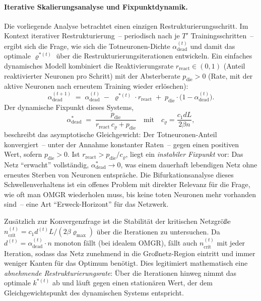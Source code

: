 \documentclass[12pt, a4paper, openany]{report}
\begin{document}
\paragraph{Iterative Skalierungsanalyse und Fixpunktdynamik.}
Die vorliegende Analyse betrachtet einen einzigen Restrukturierungsschritt.
Im Kontext iterativer Restrukturierung~-- periodisch nach je $T'$
Trainingsschritten~-- ergibt sich die Frage, wie sich die Totneuronen-Dichte
$\alpha_{\mathrm{dead}}^{(t)}$ und damit das optimale $\varrho^{*(t)}$ über
die Restrukturierungsiterationen entwickeln.  Ein einfaches dynamisches
Modell kombiniert die Reaktivierungsrate $r_{\mathrm{react}} \in (0,1)$
(Anteil reaktivierter Neuronen pro Schritt) mit der Absterberate
$p_{\mathrm{die}} > 0$ (Rate, mit der aktive Neuronen nach erneutem Training
wieder erlöschen):
\[
  \alpha_{\mathrm{dead}}^{(t+1)}
  \;=\;
  \alpha_{\mathrm{dead}}^{(t)}
  \;-\; \varrho^{*(t)} \cdot r_{\mathrm{react}}
  \;+\; p_{\mathrm{die}} \cdot \bigl(1 - \alpha_{\mathrm{dead}}^{(t)}\bigr).
\]
Der dynamische Fixpunkt dieses Systems,
\[
  \alpha^*_{\mathrm{dead}}
  \;=\; \frac{p_{\mathrm{die}}}{r_{\mathrm{react}}\,c_\varrho + p_{\mathrm{die}}}
  \quad \text{mit}\quad
  c_\varrho = \frac{c_1 d L}{2\beta n},
\]
beschreibt das asymptotische Gleichgewicht: Der Totneuronen-Anteil
konvergiert~-- unter der Annahme konstanter Raten~-- gegen einen positiven
Wert, sofern $p_{\mathrm{die}} > 0$.  Ist $r_{\mathrm{react}} > p_{\mathrm{die}}/c_\varrho$,
liegt ein \emph{instabiler Fixpunkt} vor: Das Netz ``erwacht'' vollständig,
$\alpha^*_{\mathrm{dead}} \to 0$, was einem dauerhaft lebendigen Netz ohne
erneutes Sterben von Neuronen entspräche.    Die Bifurkationsanalyse dieses
Schwellenverhaltens ist ein offenes Problem mit direkter Relevanz für die
Frage, wie oft man OMGR wiederholen muss, bis keine toten Neuronen mehr
vorhanden sind~-- eine Art ``Erweck-Horizont'' für das Netzwerk.

Zusätzlich zur Konvergenzfrage ist die Stabilität der kritischen Netzgröße
$n_{\mathrm{crit}}^{(t)} = c_1 d^{(t)} L / (2\beta\varrho_{\max})$ über die
Iterationen zu untersuchen.  Da $d^{(t)} = \alpha_{\mathrm{dead}}^{(t)} \cdot n$
monoton fällt (bei idealem OMGR), fällt auch $n_{\mathrm{crit}}^{(t)}$ mit
jeder Iteration, sodass das Netz zunehmend in die Großnetz-Region eintritt
und immer weniger Kanten für das Optimum benötigt.  Dies legitimiert
mathematisch eine \emph{abnehmende Restrukturierungsrate}: Über die
Iterationen hinweg nimmt das optimale $k^{*(t)}$ ab und läuft gegen einen
stationären Wert, der dem Gleichgewichtspunkt des dynamischen Systems entspricht.
\end{document}
